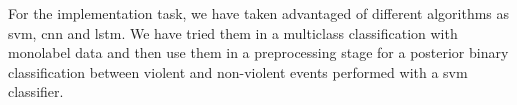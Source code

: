 	For the implementation task, we have taken advantaged of different algorithms as \acrshort{svm}, \acrshort{cnn} and \acrshort{lstm}. We have tried them in a multiclass classification with monolabel data and then use them in a preprocessing stage for a posterior binary classification between violent and non-violent events performed with a \acrshort{svm} classifier.
	
	